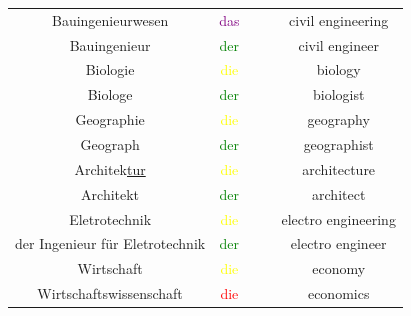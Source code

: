 \begin{center}
\begin{longtable} {|c|c|c|c|c|}
        \hline
        Bauingenieurwesen               & \textcolor{purple}{das}                        &                       &                                          & civil engineering       \\
        Bauingenieur                    & \textcolor{green}{der}                         &                       &                                          & civil engineer          \\
        \hline
        Biologie                        & \textcolor{yellow}{die}                        &                       &                                          & biology                 \\
        Biologe                         & \textcolor{green}{der}                         &                       &                                          & biologist               \\
        \hline
        Geographie                      & \textcolor{yellow}{die}                        &                       &                                          & geography               \\
        Geograph                        & \textcolor{green}{der}                         &                       &                                          & geographist             \\
        \hline
        Architek\underline{tur}         & \textcolor{yellow}{die}                        &                       &                                          & architecture            \\
        Architekt                       & \textcolor{green}{der}                         &                       &                                          & architect               \\
        \hline
        Eletrotechnik                   & \textcolor{yellow}{die}                        &                       &                                          & electro engineering     \\
        der Ingenieur für Eletrotechnik & \textcolor{green}{der}                         &                       &                                          & electro engineer        \\
        \hline
        Wirtschaft                      & \textcolor{yellow}{die}                        &                       &                                          & economy                 \\
        Wirtschaftswissenschaft         & \textcolor{red}{die}                           &                       &                                          & economics               \\

\end{longtable}
\end{center}
